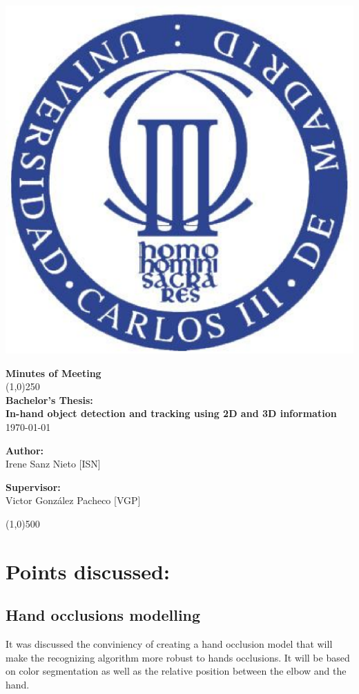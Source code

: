 \documentclass{article}
\newenvironment{myindentpar}[1]%
 {\begin{list}{}%
         {\setlength{\leftmargin}{#1}}%
         \item[]%
 }
 {\end{list}}
\begin{document}
\includegraphics[width=0.1\linewidth]{../template/uc3m.eps}

\vspace{-1cm}
\begin{minipage}[b]{1\linewidth}
	\begin{center}
	{\Huge \bfseries{Minutes of Meeting}}\\
	\line(1,0){250}\\[0.5cm]
	{\LARGE \textbf{Bachelor's Thesis:\\[0.5cm] In-hand object detection and tracking using 2D and 3D information}}\\[0.5cm]
	{\large \today}
	\end{center}
\end {minipage}



\begin{minipage}{0.55\textwidth}
\begin{flushleft} \large
\textbf{{Author:}\\}
Irene Sanz Nieto [ISN]\\
\end{flushleft}
\end{minipage}
\begin{minipage}{0.4\textwidth}
\begin{flushright} \large
\textbf{Supervisor: }\\
Victor González Pacheco [VGP]
\end{flushright}\end{minipage}

\begin{center}
\line(1,0){500}
\end{center}

\renewcommand{\thesubsection}
{\hspace*{1cm} \arabic{section}.\arabic{subsection}}



\section{\LARGE Points discussed: }
	\subsection{Hand occlusions modelling}
		\begin{myindentpar}{1cm} 
		It was discussed the conviniency of creating a hand occlusion model that will make the recognizing algorithm more robust to hands occlusions. It will  be based on color segmentation as well as the relative position between the elbow and the hand. 
		\end{myindentpar}
\end{document}

